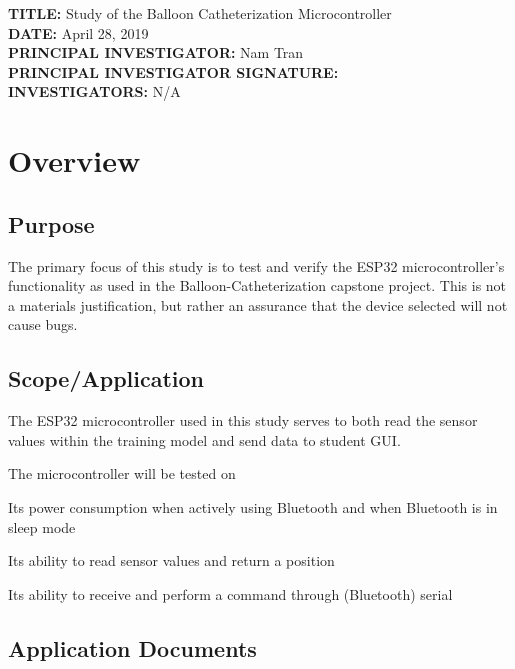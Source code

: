 \documentclass[12pt]{article}
\begin{document}
\begin{titlepage}
	\raggedright
	\vspace*{\fill}
	\textbf{TITLE:} Study of the Balloon Catheterization Microcontroller \\
	\vspace{2cm}
	\textbf{DATE:} April 28, 2019 \\
	\vspace{2cm}
	\textbf{PRINCIPAL INVESTIGATOR:} Nam Tran \\
	\vspace{2cm}
	\textbf{PRINCIPAL INVESTIGATOR SIGNATURE:} \\
	\vspace{2cm}
	\textbf{INVESTIGATORS:} N/A \\
	\vspace*{\fill}
\end{titlepage}

\section{Overview}
\subsection{Purpose}
The primary focus of this study is to test and verify the ESP32 microcontroller's functionality as used in the Balloon-Catheterization capstone project. This is not a materials justification, but rather an assurance that the device selected will not cause bugs.

\subsection{Scope/Application}
The ESP32 microcontroller used in this study serves to both read the sensor values within the training model and send data to student GUI. 

The microcontroller will be tested on
\begin{purposelist}
    \item Its power consumption when actively using Bluetooth and when Bluetooth is in sleep mode
    \item Its ability to read sensor values and return a position
    \item Its ability to receive and perform a command through (Bluetooth) serial
\end{purposelist}

\subsection{Application Documents}
    
\end{document}
